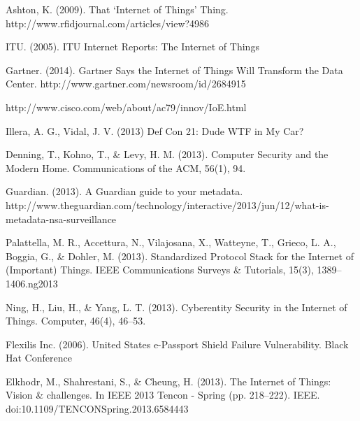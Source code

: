 \documentclass[10pt,journal,compsoc]{IEEEtran}
\begin{document}
%
%
%
\begin{thebibliography}{1}

Ashton, K. (2009). That `Internet of Things' Thing. http://www.rfidjournal.com/articles/view?4986

ITU. (2005). ITU Internet Reports: The Internet of Things

Gartner. (2014). Gartner Says the Internet of Things Will Transform the Data Center. http://www.gartner.com/newsroom/id/2684915

http://www.cisco.com/web/about/ac79/innov/IoE.html

Illera, A. G., Vidal, J. V. (2013) Def Con 21: Dude WTF in My Car?  

Denning, T., Kohno, T., \& Levy, H. M. (2013). Computer Security and the Modern Home. Communications of the ACM, 56(1), 94. 

Guardian. (2013). A Guardian guide to your metadata. http://www.theguardian.com/technology/interactive/2013/jun/12/what-is-metadata-nsa-surveillance

Palattella, M. R., Accettura, N., Vilajosana, X., Watteyne, T., Grieco, L. A., Boggia, G., \& Dohler, M. (2013). Standardized Protocol Stack for the Internet of (Important) Things. IEEE Communications Surveys \& Tutorials, 15(3), 1389–1406.ng2013 

Ning, H., Liu, H., \& Yang, L. T. (2013). Cyberentity Security in the Internet of Things. Computer, 46(4), 46–53. 

Flexilis Inc. (2006). United States e-Passport Shield Failure Vulnerability. Black Hat Conference

Elkhodr, M., Shahrestani, S., \& Cheung, H. (2013). The Internet of Things: Vision \& challenges. In IEEE 2013 Tencon - Spring (pp. 218–222). IEEE. doi:10.1109/TENCONSpring.2013.6584443


\end{thebibliography}
\end{document}
